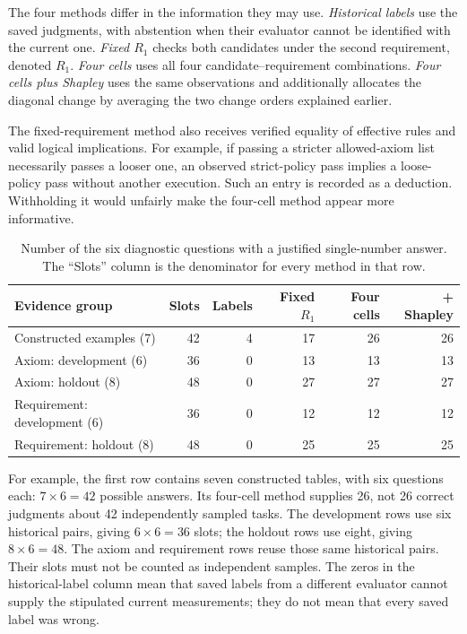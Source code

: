 The four methods differ in the information they may use. \emph{Historical labels} use the saved judgments, with abstention when their evaluator cannot be identified with the current one. \emph{Fixed $R_1$} checks both candidates under the second requirement, denoted $R_1$. \emph{Four cells} uses all four candidate--requirement combinations. \emph{Four cells plus Shapley} uses the same observations and additionally allocates the diagonal change by averaging the two change orders explained earlier.

The fixed-requirement method also receives verified equality of effective rules and valid logical implications. For example, if passing a stricter allowed-axiom list necessarily passes a looser one, an observed strict-policy pass implies a loose-policy pass without another execution. Such an entry is recorded as a deduction. Withholding it would unfairly make the four-cell method appear more informative.

\begin{table}[htbp]
\centering\small
\caption{Number of the six diagnostic questions with a justified single-number answer. The ``Slots'' column is the denominator for every method in that row.}
\label{tab:availability}
\begin{tabularx}{\linewidth}{Y r r r r r}
\toprule
Evidence group & Slots & Labels & Fixed $R_1$ & Four cells & + Shapley \\
\midrule
Constructed examples (7) & 42 & 4 & 17 & 26 & 26 \\
Axiom: development (6) & 36 & 0 & 13 & 13 & 13 \\
Axiom: holdout (8) & 48 & 0 & 27 & 27 & 27 \\
Requirement: development (6) & 36 & 0 & 12 & 12 & 12 \\
Requirement: holdout (8) & 48 & 0 & 25 & 25 & 25 \\
\bottomrule
\end{tabularx}
\end{table}

For example, the first row contains seven constructed tables, with six questions each: $7\times6=42$ possible answers. Its four-cell method supplies 26, not 26 correct judgments about 42 independently sampled tasks. The development rows use six historical pairs, giving $6\times6=36$ slots; the holdout rows use eight, giving $8\times6=48$. The axiom and requirement rows reuse those same historical pairs. Their slots must not be counted as independent samples. The zeros in the historical-label column mean that saved labels from a different evaluator cannot supply the stipulated current measurements; they do not mean that every saved label was wrong.

